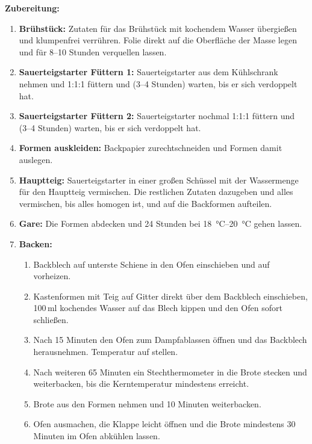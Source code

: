 \vspace{1.5em}
\noindent\textbf{Zubereitung:}
\vspace{0.5em}
\thispagestyle{fancy}

\begin{enumerate}[label=\textbf{\arabic*.}, leftmargin=1.8em, itemsep=1em, topsep=0pt]
    \item \textbf{Brühstück:} Zutaten für das Brühstück mit kochendem Wasser übergießen und klumpenfrei verrühren. Folie direkt auf die Oberfläche der Masse legen und für 8--10 Stunden verquellen lassen.
    
    \item \textbf{Sauerteigstarter Füttern 1:} Sauerteigstarter aus dem Kühlschrank nehmen und 1:1:1 füttern und (3--4 Stunden) warten, bis er sich verdoppelt hat.
    
    \item \textbf{Sauerteigstarter Füttern 2:} Sauerteigstarter nochmal 1:1:1 füttern und (3--4 Stunden) warten, bis er sich verdoppelt hat.

     \item \textbf{Formen auskleiden:} Backpapier zurechtschneiden und Formen damit auslegen.
   
    \item \textbf{Hauptteig:} Sauerteigstarter in einer großen Schüssel mit der Wassermenge für den Hauptteig vermischen. Die restlichen Zutaten dazugeben und alles vermischen, bis alles homogen ist, und auf die Backformen aufteilen.
    
    \item \textbf{Gare:} Die Formen abdecken und 24 Stunden bei \qtyrange{18}{20}{\celsius} gehen lassen.
    
    \item \textbf{Backen:}
    \begin{enumerate}
    	\item Backblech auf unterste Schiene in den Ofen einschieben und auf  vorheizen.
    	\item Kastenformen mit Teig auf Gitter direkt über dem Backblech einschieben, 100\,ml kochendes Wasser auf das Blech kippen und den Ofen sofort schließen.
    	\item Nach 15 Minuten den Ofen zum Dampfablassen öffnen und das Backblech herausnehmen. Temperatur auf  stellen.
    	\item Nach weiteren 65 Minuten ein Stechthermometer in die Brote stecken und weiterbacken, bis die Kerntemperatur mindestens  erreicht.
    	\item Brote aus den Formen nehmen und 10 Minuten weiterbacken.
    	\item Ofen ausmachen, die Klappe leicht öffnen und die Brote mindestens 30 Minuten im Ofen abkühlen lassen.
    \end{enumerate}
         
\end{enumerate}


